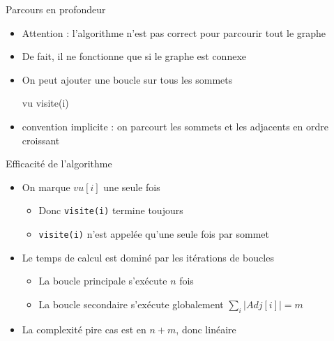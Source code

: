 
\begin{frame}{Parcours en profondeur}
    \begin{itemize}
        \item Attention : l'algorithme n'est pas correct pour parcourir tout le graphe
        \item De fait, il ne fonctionne que si le graphe est connexe 
        \pause 
        \item On peut ajouter une boucle sur tous les sommets 
        \pause 
        \begin{algorithm}[H]
            \begin{algorithmic}[1]
                \State vu 
                        \State visite(i)
                    \EndIf
                \EndFor
             \end{algorithmic}
            \caption{Parcours en profondeur}
            \label{alg:prof:alg}
            \end{algorithm}
        \pause 
        \item convention implicite : on parcourt les sommets et les adjacents en ordre croissant
    \end{itemize}
\end{frame}



\begin{frame}{Efficacité de l'algorithme}
    \begin{itemize}
        \item On marque $vu[i]$ une seule fois 
        \begin{itemize}
            \item Donc \texttt{visite(i)} termine toujours
            \item \texttt{visite(i)} n'est appelée qu'une seule fois par sommet
        \end{itemize}
        \item Le temps de calcul est dominé par les itérations de boucles
        \begin{itemize}
            \item La boucle principale s'exécute $n$ fois 
            \item La boucle secondaire s'exécute globalement $\sum_i | Adj[i] | = m$
        \end{itemize}
        \item La complexité pire cas est en $n+m$, donc linéaire
    \end{itemize}
\end{frame}

